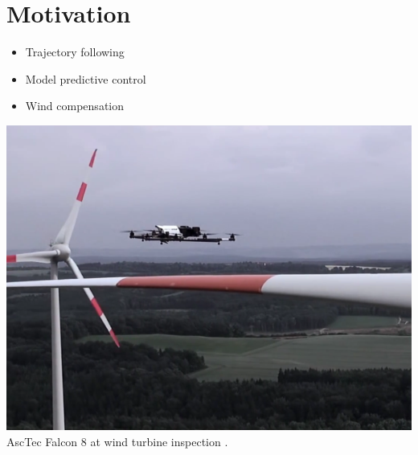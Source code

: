\ETHslide
\section*{Motivation}
\vspace*{\fill}

\begin{minipage}{0.5\textwidth}
	\begin{itemize}
		\item[\ETHitem] Trajectory following
		\item[\ETHitem] Model predictive control
		\item[\ETHitem] Wind compensation
\end{itemize}
\end{minipage}
\begin{minipage}{0.49\textwidth}
	\centering
	\includegraphics[width=1\textwidth]{images/mav_wind_turbine.png}\\
	\tiny{AscTec Falcon 8 at wind turbine inspection \cite{www:asctecinspect}.} 
\end{minipage}

\vspace*{\fill}
\clearpage
